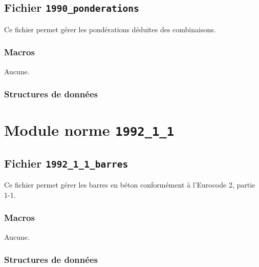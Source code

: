 \documentclass{article}
\begin{document}
\subsection{Fichier {\texttt{1990\_ponderations}}}
Ce fichier permet gérer les pondérations déduites des combinaisons.
\subsubsection{Macros}
Aucune.
\subsubsection{Structures de données}












\section{Module norme {\texttt{1992\_1\_1}}}
\subsection{Fichier {\texttt{1992\_1\_1\_barres}}}
Ce fichier permet gérer les barres en béton conformément à l'Eurocode 2, partie 1-1.
\subsubsection{Macros}
Aucune.
\subsubsection{Structures de données}














\end{document}
